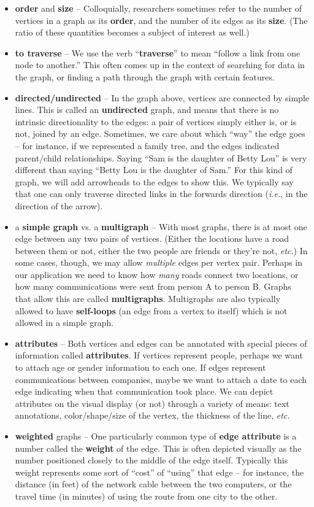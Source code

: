 \begin{itemize}
\itemsep.1em
\item \textbf{order} and \textbf{size} -- Colloquially, researchers sometimes
refer to the number of vertices in a graph as its \textbf{order}, and the
number of its edges as its \textbf{size}. (The ratio of these quantities
becomes a subject of interest as well.)
\item \textbf{to traverse} -- We use the verb ``\textbf{traverse}'' to mean
``follow a link from one node to another.'' This often comes up in the context
of searching for data in the graph, or finding a path through the graph with
certain features.
\item \textbf{directed/undirected} -- In the graph above, vertices are
connected by simple lines. This is called an \textbf{undirected} graph, and
means that there is no intrinsic directionality to the edges: a pair of
vertices simply either is, or is not, joined by an edge. Sometimes, we care
about which ``way'' the edge goes -- for instance, if we represented a family
tree, and the edges indicated parent/child relationships. Saying ``Sam is the
daughter of Betty Lou'' is very different than saying ``Betty Lou is the
daughter of Sam.'' For this kind of graph, we will add arrowheads to the edges
to show this. We typically say that one can only traverse directed links in
the forwards direction (\textit{i.e.}, in the direction of the arrow).
\item a \textbf{simple graph} vs. a \textbf{multigraph} -- With most graphs,
there is at most one edge between any two pairs of vertices. (Either the
locations have a road between them or not, either the two people are friends
or they're not, \textit{etc.}) In some cases, though, we may allow
\textit{multiple} edges per vertex pair. Perhaps in our application we need to
know how \textit{many} roads connect two locations, or how many communications
were sent from person A to person B. Graphs that allow this are called
\textbf{multigraphs}. Multigraphs are also typically allowed to have
\textbf{self-loops} (an edge from a vertex to itself) which is not allowed in
a simple graph.
\item \textbf{attributes} -- Both vertices and edges can be annotated with
special pieces of information called \textbf{attributes}. If vertices
represent people, perhaps we want to attach age or gender information to each
one. If edges represent communications between companies, maybe we want to
attach a date to each edge indicating when that communication took place. We
can depict attributes on the visual display (or not) through a variety of
means: text annotations, color/shape/size of the vertex, the thickness of the
line, \textit{etc.}
\item \textbf{weighted} graphs -- One particularly common type of \textbf{edge
attribute} is a number called the \textbf{weight} of the edge. This is often
depicted visually as the number positioned closely to the middle of the edge
itself. Typically this weight represents some sort of ``cost'' of ``using'' that
edge -- for instance, the distance (in feet) of the network cable between the
two computers, or the travel time (in minutes) of using the route from one
city to the other.
\end{itemize}
